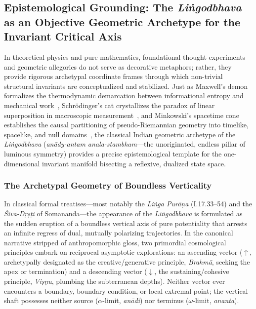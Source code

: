 \documentclass[11pt,a4paper,reqno]{article}
\theoremstyle{plain}
\theoremstyle{definition}
\theoremstyle{remark}
\numberwithin{equation}{section}
\begin{document}
\subsection{Epistemological Grounding: The \emph{Li\.{n}godbhava} as an Objective Geometric Archetype for the Invariant Critical Axis}
\label{subsec:lingodbhava_archetype}

In theoretical physics and pure mathematics, foundational thought experiments and geometric allegories do not serve as decorative metaphors; rather, they provide rigorous archetypal coordinate frames through which non-trivial structural invariants are conceptualized and stabilized. Just as Maxwell's demon formalizes the thermodynamic demarcation between informational entropy and mechanical work~\cite{Maxwell1871}, Schr\"{o}dinger's cat crystallizes the paradox of linear superposition in macroscopic measurement~\cite{Schrodinger1935}, and Minkowski's spacetime cone establishes the causal partitioning of pseudo-Riemannian geometry into timelike, spacelike, and null domains~\cite{Minkowski1908}, the classical Indian geometric archetype of the \emph{Li\.{n}godbhava} (\textit{an\={a}dy-antam anala-stambham}---the unoriginated, endless pillar of luminous symmetry) provides a precise epistemological template for the one-dimensional invariant manifold bisecting a reflexive, dualized state space.

\subsubsection{The Archetypal Geometry of Boundless Verticality}
In classical formal treatises---most notably the \emph{Li\.{n}ga Pur\={a}\d{n}a} (I.17.33--54) and the \emph{\'{S}iva-D\d{r}\d{s}\d{t}i} of Som\={a}nanda---the appearance of the \emph{Li\.{n}godbhava} is formulated as the sudden eruption of a boundless vertical axis of pure potentiality that arrests an infinite regress of dual, mutually polarizing trajectories. In the canonical narrative stripped of anthropomorphic gloss, two primordial cosmological principles embark on reciprocal asymptotic explorations: an ascending vector ($\uparrow$, archetypally designated as the creative/generative principle, \emph{Brahm\={a}}, seeking the apex or termination) and a descending vector ($\downarrow$, the sustaining/cohesive principle, \emph{Vi\d{s}\d{n}u}, plumbing the subterranean depths). Neither vector ever encounters a boundary, boundary condition, or local extremal point; the vertical shaft possesses neither source ($\alpha$-limit, \emph{an\={a}di}) nor terminus ($\omega$-limit, \emph{ananta}). 
\end{document}
